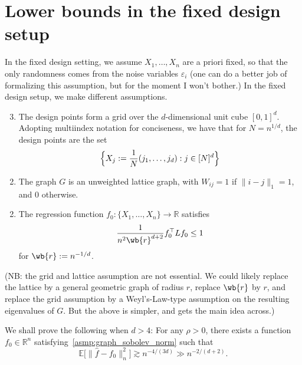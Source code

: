 \documentclass{article}
\newcommand{\Reals}{\mathbb{R}}
\newcommand{\1}{\mathbf{1}}
\newcommand{\Lap}{L}
\newcommand{\wh}[1]{\widehat{#1}}
\theoremstyle{definition}
\theoremstyle{remark}
\begin{document}
\section{Lower bounds in the fixed design setup}
In the fixed design setting, we assume $X_1,\ldots,X_n$ are a priori fixed, so that the only randomness comes from the noise variables $\varepsilon_i$ (one can do a better job of formalizing this assumption, but for the moment I won't bother.) In the fixed design setup, we make different assumptions.
\begin{enumerate}[label=(P\arabic*)]
	\setcounter{enumi}{2}	
	\item  
	\label{asmp:grid}
	The design points form a grid over the $d$-dimensional unit cube $[0,1]^d$. Adopting multiindex notation for conciseness, we have that for $N = n^{1/d}$, the design points are the set
	\begin{equation*}
	\Bigl\{X_j := \frac{1}{N}(j_1,\ldots,j_d): j \in [N]^d\Bigr\}
	\end{equation*}
\end{enumerate}

\begin{enumerate}[label=(G\arabic*)]
	\setcounter{enumi}{1}
	\item 
	\label{asmp:lattice}
	The graph $G$ is an unweighted lattice graph, with $W_{ij} = 1$ if $\|i - j\|_1 = 1$, and $0$ otherwise.
\end{enumerate}

\begin{enumerate}[label=(F\arabic*)]
	\setcounter{enumi}{1}
	\item 
	\label{asmp:graph_sobolev_norm}
	The regression function $f_0: \{X_1,\ldots,X_n\} \to \Reals$ satisfies
	\begin{equation*}
	\frac{1}{n^2\wb{r}^{d + 2}} f_0^{\top} \Lap f_0 \leq 1
	\end{equation*}
	for $\wb{r} := n^{-1/d}$.
\end{enumerate}
(NB: the grid and lattice assumption are not essential. We could likely replace the lattice by a general geometric graph of radius $r$, replace $\wb{r}$ by $r$, and replace the grid assumption by a Weyl's-Law-type assumption on the resulting eigenvalues of $G$. But the above is simpler, and gets the main idea across.) 

We shall prove the following when $d > 4$: For any $\rho > 0$, there exists a function $f_0 \in \Reals^n$ satisfying~\ref{asmp:graph_sobolev_norm} such that
\begin{equation}
\label{eqn:lb_mse}
\mathbb{E}\bigl[\|\wh{f} - f_0\|_n^2\bigr] \gtrsim n^{-4/(3d)} \gg n^{-2/(d + 2)}.
\end{equation}
\end{document}

